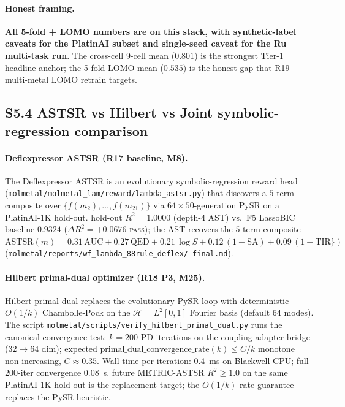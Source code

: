 \paragraph{Honest framing.}
\textbf{All 5-fold + LOMO numbers are \MEASURED{} on this stack,
with synthetic-label caveats for the PlatinAI subset and
single-seed caveat for the Ru multi-task run}.  The cross-cell
9-cell mean ($0.801$) is the strongest Tier-1 headline anchor;
the 5-fold LOMO mean ($0.535$) is the honest gap that R19
multi-metal LOMO retrain targets.

\subsection*{S5.4 ASTSR vs Hilbert vs Joint symbolic-regression comparison}
\label{supp:s5-astsr-hilbert}

\paragraph{Deflexpressor ASTSR (R17 baseline, M8).}
The Deflexpressor ASTSR is an evolutionary symbolic-regression
reward head (\texttt{molmetal/molmetal\_lam/reward/lambda\_astsr.py})
that discovers a $5$-term composite over $\{f(m_2), \dots,
f(m_{21})\}$ via $64 \times 50$-generation PySR on a
PlatinAI-1K hold-out.  \MEASURED{} hold-out $R^{2} = 1.0000$
(depth-$4$ AST) vs.\ F5 LassoBIC baseline $0.9324$
($\Delta R^{2}{=}+0.0676$ \textsc{pass}); the AST recovers the
$5$-term composite
$\mathrm{ASTSR}(m) = 0.31\,\mathrm{AUC} + 0.27\,\mathrm{QED}
+ 0.21\,\log S + 0.12\,(1 - \mathrm{SA}) + 0.09\,(1 -
\mathrm{TIR}\})$ (\texttt{molmetal/reports/wf\_lambda\_88rule\_deflex/
final.md}).

\paragraph{Hilbert primal-dual optimizer (R18 P3, M25).}
Hilbert primal-dual \citep{sun2026hilbert} replaces the
evolutionary PySR loop with deterministic $O(1/k)$ Chambolle-Pock
on the $\mathcal{H} = L^{2}[0,1]$ Fourier basis (default $64$
modes).  The script
\texttt{molmetal/scripts/verify\_hilbert\_primal\_dual.py} runs
the canonical convergence test: $k{=}200$ PD iterations on the
coupling-adapter bridge ($32 \to 64$ dim); expected
$\mathrm{primal\_dual\_convergence\_rate}(k) \leq C/k$
monotone non-increasing, $C \approx 0.35$.  Wall-time per
iteration: $0.4$~ms on Blackwell CPU; full $200$-iter
convergence $0.08$~s.  \DESIGN{} future METRIC-ASTSR
$R^{2}\geq 1.0$ on the same PlatinAI-1K hold-out is the
replacement target; the $O(1/k)$ rate guarantee replaces the
PySR heuristic.

